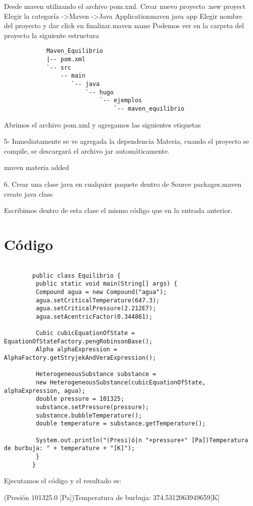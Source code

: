 		Desde maven utilizando el archivo pom.xml.
		    Crear nuevo proyecto :new proyect
		     Elegir la categoría ->Maven ->Java Applicationmaven java app
		    Elegir nombre del proyecto y dar click en finalizar.maven name
		    Podemos ver en la carpeta del proyecto la siguiente estructura
		\begin{verbatim}
		    Maven_Equilibrio
		    |-- pom.xml
		    `-- src
		        -- main
		           `-- java
		               `-- hugo
		                   `-- ejemplos
		                       `-- maven_equilibrio
		\end{verbatim}
		Abrimos el archivo pom.xml y agregamos las siguientes etiquetas


		


		5- Inmediatamente se ve agregada la dependencia Materia, cuando el proyecto se compile, se descargará el archivo jar automáticamente.

		maven materia added

		6.  Crear una clase java en cualquier paquete dentro de Source packages.maven create java class

		Escribimos dentro de esta clase el mismo código que en la entrada anterior.

	\section{Código}
		\begin{lstlisting}
			
		public class Equilibrio {
		 public static void main(String[] args) {
		 Compound agua = new Compound("agua");
		 agua.setCriticalTemperature(647.3);
		 agua.setCriticalPressure(2.212E7);
		 agua.setAcentricFactor(0.344861);
		 
		 Cubic cubicEquationOfState = EquationOfStateFactory.pengRobinsonBase();
		 Alpha alphaExpression = AlphaFactory.getStryjekAndVeraExpression();
		 
		 HeterogeneousSubstance substance =
		 new HeterogeneousSubstance(cubicEquationOfState, alphaExpression, agua);
		 double pressure = 101325;
		 substance.setPressure(pressure);
		 substance.bubbleTemperature();
		 double temperature = substance.getTemperature();
		 
		 System.out.println("(Presi|ó|n "+pressure+" [Pa])Temperatura de burbuja: " + temperature + "[K]");
		 }
		}

		\end{lstlisting}
		Ejecutamos el código y el resultado es:

		(Presión 101325.0 [Pa])Temperatura de burbuja: 374.5312063949659[K]